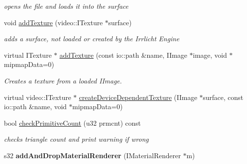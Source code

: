 \begin{DoxyCompactItemize}
\begin{DoxyCompactList}\small\item\em opens the file and loads it into the surface \end{DoxyCompactList}\item 
\hypertarget{classirr_1_1video_1_1_c_null_driver_a58c630b0b28ff0f7098e9ea53b682b3f}{void \hyperlink{classirr_1_1video_1_1_c_null_driver_a58c630b0b28ff0f7098e9ea53b682b3f}{add\-Texture} (video\-::\-I\-Texture $\ast$surface)}\label{classirr_1_1video_1_1_c_null_driver_a58c630b0b28ff0f7098e9ea53b682b3f}

\begin{DoxyCompactList}\small\item\em adds a surface, not loaded or created by the Irrlicht Engine \end{DoxyCompactList}\item 
\hypertarget{classirr_1_1video_1_1_c_null_driver_afd1fd74504ed92f9bc974ca5d5d8fba8}{virtual I\-Texture $\ast$ \hyperlink{classirr_1_1video_1_1_c_null_driver_afd1fd74504ed92f9bc974ca5d5d8fba8}{add\-Texture} (const io\-::path \&name, I\-Image $\ast$image, void $\ast$mipmap\-Data=0)}\label{classirr_1_1video_1_1_c_null_driver_afd1fd74504ed92f9bc974ca5d5d8fba8}

\begin{DoxyCompactList}\small\item\em Creates a texture from a loaded I\-Image. \end{DoxyCompactList}\item 
virtual video\-::\-I\-Texture $\ast$ \hyperlink{classirr_1_1video_1_1_c_null_driver_aaf9971d937700eb90cbf1ff74b249eba}{create\-Device\-Dependent\-Texture} (I\-Image $\ast$surface, const io\-::path \&name, void $\ast$mipmap\-Data=0)
\item 
\hypertarget{classirr_1_1video_1_1_c_null_driver_aa08a0d59285472382cb551ac75ac8317}{bool \hyperlink{classirr_1_1video_1_1_c_null_driver_aa08a0d59285472382cb551ac75ac8317}{check\-Primitive\-Count} (u32 prmcnt) const }\label{classirr_1_1video_1_1_c_null_driver_aa08a0d59285472382cb551ac75ac8317}

\begin{DoxyCompactList}\small\item\em checks triangle count and print warning if wrong \end{DoxyCompactList}\item 
\hypertarget{classirr_1_1video_1_1_c_null_driver_a46374b7dd18160731ffbc67e1e3bf5eb}{s32 {\bfseries add\-And\-Drop\-Material\-Renderer} (I\-Material\-Renderer $\ast$m)}\label{classirr_1_1video_1_1_c_null_driver_a46374b7dd18160731ffbc67e1e3bf5eb}


\end{DoxyCompactItemize}

